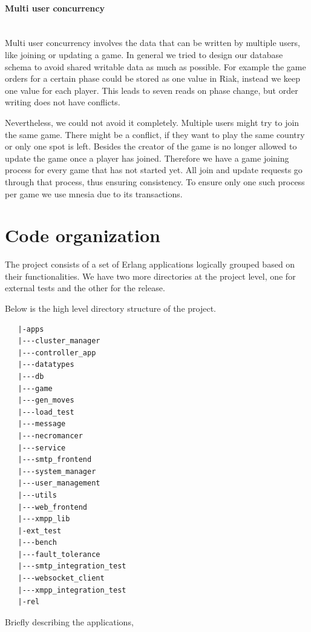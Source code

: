 \documentclass[11pt,a4paper]{report}
\newcommand{\subsubsubsection}[1]{\paragraph{#1}\mbox{}\\}
\begin{document}
\subsubsubsection{Multi user concurrency}
Multi user concurrency involves the data that can be written by multiple users,
like joining or updating a game.
In general we tried to  design our database schema to avoid shared writable data
as much as possible.
For example the game orders for a certain phase could be stored as one value in
Riak, instead we keep one value for each player.
This leads to seven reads on phase change, but order writing does not have
conflicts.

Nevertheless, we could not avoid it completely.
Multiple users might try to join the same game.
There might be a conflict, if they want to play the same country or only one
spot is left.
Besides the creator of the game is no longer allowed to update the game once a
player has joined.
Therefore we have a game joining process for every game that has not started
yet.
All join and update requests go through that process, thus ensuring consistency.
To ensure only one such process per game we use mnesia due to its transactions.

\section{Code organization}

The project consists of a set of Erlang applications logically grouped
based on their functionalities. We have two more directories at the
project level, one for external tests and the other for the release.

Below is the high level directory structure of the project.

\begin{verbatim}
   |-apps
   |---cluster_manager
   |---controller_app
   |---datatypes
   |---db
   |---game
   |---gen_moves
   |---load_test
   |---message
   |---necromancer
   |---service
   |---smtp_frontend
   |---system_manager
   |---user_management
   |---utils
   |---web_frontend
   |---xmpp_lib
   |-ext_test
   |---bench
   |---fault_tolerance
   |---smtp_integration_test
   |---websocket_client
   |---xmpp_integration_test
   |-rel
\end{verbatim}

Briefly describing the applications,
\end{document}
